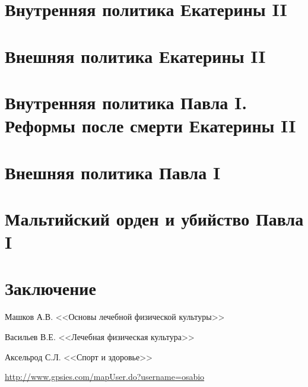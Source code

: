 \documentclass[a4paper,12pt]{diss_4}
\begin{document}
\chapter{Внутренняя политика Екатерины II}
\chapter{Внешняя политика Екатерины II}
\chapter{Внутренняя политика Павла I. Реформы после смерти Екатерины II}
\chapter{Внешняя политика Павла I}
\chapter{Мальтийский орден и убийство Павла I}



\chapter*{Заключение}


\begin{thebibliography}{99}

 Машков А.В. <<Основы лечебной физической культуры>>

 Васильев В.Е. <<Лечебная физическая культура>>

 Аксельрод С.Л.  <<Спорт и здоровье>>

 \href{http://www.gpsies.com/mapUser.do?username=osabio}{http://www.gpsies.com/mapUser.do?username=osabio}

\end{thebibliography}
\end{document}
